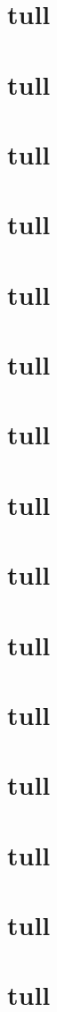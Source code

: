 \documentclass[british,titlepage,onepage]{ntnuthesis}
\begin{document}
\section{tull}
\section{tull}
\section{tull}
\section{tull}
\section{tull}
\section{tull}
\section{tull}
\section{tull}
\section{tull}
\section{tull}
\section{tull}
\section{tull}
\section{tull}
\section{tull}
\section{tull}
\end{document}
